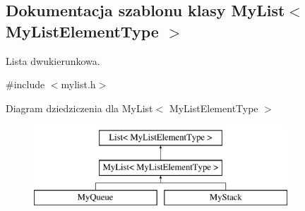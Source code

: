 \hypertarget{class_my_list}{\subsection{Dokumentacja szablonu klasy My\-List$<$ My\-List\-Element\-Type $>$}
\label{class_my_list}
}


Lista dwukierunkowa.  




{\ttfamily \#include $<$mylist.\-h$>$}

Diagram dziedziczenia dla My\-List$<$ My\-List\-Element\-Type $>$\begin{figure}[H]
\begin{center}
\leavevmode
\includegraphics[height=3.000000cm]{class_my_list}
\end{center}
\end{figure}
